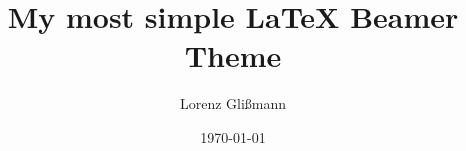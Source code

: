 \documentclass{beamer}
\author{Lorenz Glißmann}
\title{My most simple \LaTeX{} Beamer Theme}
\institute{Universität Göttingen}
\date{\today}
\begin{document}
\setcounter{page}{0}
\begin{frame}[t,plain]
\titlepage
\end{frame}


\end{document}
